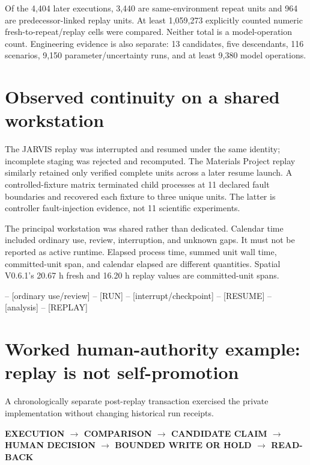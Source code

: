 Of the 4,404 later executions, 3,440 are same-environment repeat units and 964 are predecessor-linked replay units. At least 1,059,273 explicitly counted numeric fresh-to-repeat/replay cells were compared. Neither total is a model-operation count. Engineering evidence is also separate: 13 candidates, five descendants, 116 scenarios, 9,150 parameter/uncertainty runs, and at least 9,380 model operations.

\section{Observed continuity on a shared workstation}
The JARVIS replay was interrupted and resumed under the same identity; incomplete staging was rejected and recomputed. The Materials Project replay similarly retained only verified complete units across a later resume launch. A controlled-fixture matrix terminated child processes at 11 declared fault boundaries and recovered each fixture to three unique units. The latter is controller fault-injection evidence, not 11 scientific experiments.

The principal workstation was shared rather than dedicated. Calendar time included ordinary use, review, interruption, and unknown gaps. It must not be reported as active runtime. Elapsed process time, summed unit wall time, committed-unit span, and calendar elapsed are different quantities. Spatial V0.6.1's 20.67 h fresh and 16.20 h replay values are committed-unit spans.

\begin{center}\small\ttfamily
[RUN] -- [ordinary use/review] -- [RUN] -- [interrupt/checkpoint] -- [RESUME] -- [analysis] -- [REPLAY]
\end{center}


\section{Worked human-authority example: replay is not self-promotion}
A chronologically separate post-replay transaction exercised the private implementation without changing historical run receipts.

\begin{center}\small\bfseries
EXECUTION $\rightarrow$ COMPARISON $\rightarrow$ CANDIDATE CLAIM $\rightarrow$ HUMAN DECISION $\rightarrow$ BOUNDED WRITE OR HOLD $\rightarrow$ READ-BACK
\end{center}


